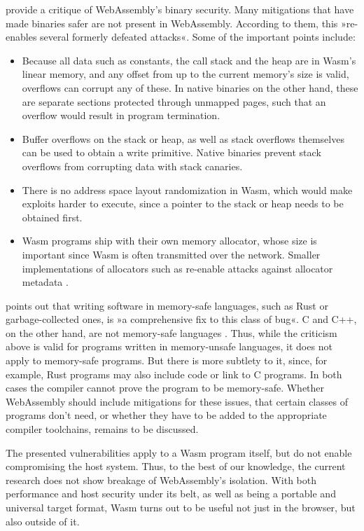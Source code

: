 \citeauthor{Lehmann2020} provide a critique of WebAssembly's binary security. Many mitigations that have made  binaries safer are not present in WebAssembly. According to them, this »re-enables several formerly defeated attacks«. Some of the important points include:

\begin{itemize}
    \item Because all data such as constants, the call stack and the heap are in Wasm's linear memory, and any offset from up to the current memory's size is valid, overflows can corrupt any of these. In native binaries on the other hand, these are separate sections protected through unmapped pages, such that an overflow would result in program termination.
    \item Buffer overflows on the stack or heap, as well as stack overflows themselves can be used to obtain a write primitive. Native binaries prevent stack overflows from corrupting data with stack canaries.
    \item There is no address space layout randomization in Wasm, which would make exploits harder to execute, since a pointer to the stack or heap needs to be obtained first.
    \item Wasm programs ship with their own memory allocator, whose size is important since Wasm is often transmitted over the network. Smaller implementations of allocators such as  re-enable attacks against allocator metadata \cite{Lehmann2020}.
\end{itemize}

\citeauthor{Wingo2020} points out that writing software in memory-safe languages, such as Rust or garbage-collected ones, is »a comprehensive fix to this class of bug«. C and C++, on the other hand, are not memory-safe languages \cite{Wingo2020}. Thus, while the criticism above is valid for programs written in memory-unsafe languages, it does not apply to memory-safe programs. But there is more subtlety to it, since, for example, Rust programs may also include  code or link to C programs. In both cases the compiler cannot prove the program to be memory-safe. Whether WebAssembly should include mitigations for these issues, that certain classes of programs don't need, or whether they have to be added to the appropriate compiler toolchains, remains to be discussed.

The presented vulnerabilities apply to a Wasm program itself, but do not enable compromising the host system. Thus, to the best of our knowledge, the current research does not show breakage of WebAssembly's isolation. With both performance and host security under its belt, as well as being a portable and universal target format, Wasm turns out to be useful not just in the browser, but also outside of it.

